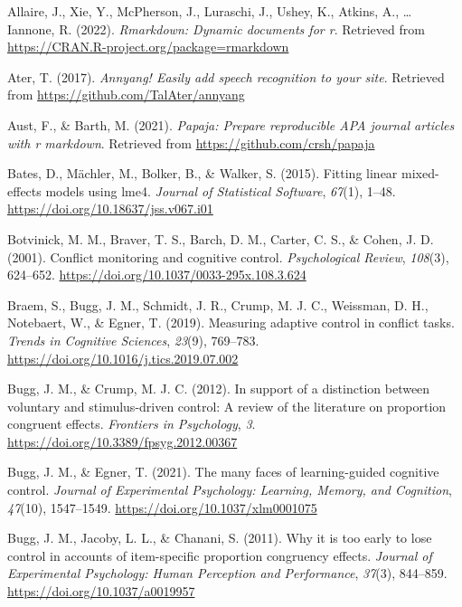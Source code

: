 \documentclass[
  ,man,floatsintext]{apa6}
\newlength{\cslhangindent}
\newlength{\cslentryspacingunit} %
\newenvironment{CSLReferences}[2] %
 {%
  \setlength{\parindent}{0pt}
  \ifodd #1
  \let\oldpar\par
  \def\par{\hangindent=\cslhangindent\oldpar}
  \fi
  \setlength{\parskip}{#2\cslentryspacingunit}
 }%
 {}
\begin{document}
\hypertarget{refs}{}
\begin{CSLReferences}{1}{0}
\leavevmode{}%
Allaire, J., Xie, Y., McPherson, J., Luraschi, J., Ushey, K., Atkins, A., \ldots{} Iannone, R. (2022). \emph{Rmarkdown: Dynamic documents for r}. Retrieved from \url{https://CRAN.R-project.org/package=rmarkdown}

\leavevmode{}%
Ater, T. (2017). \emph{Annyang! Easily add speech recognition to your site}. Retrieved from \url{https://github.com/TalAter/annyang}

\leavevmode{}%
Aust, F., \& Barth, M. (2021). \emph{Papaja: Prepare reproducible APA journal articles with r markdown}. Retrieved from \url{https://github.com/crsh/papaja}

\leavevmode{}%
Bates, D., Mächler, M., Bolker, B., \& Walker, S. (2015). Fitting linear mixed-effects models using {lme4}. \emph{Journal of Statistical Software}, \emph{67}(1), 1--48. \url{https://doi.org/10.18637/jss.v067.i01}

\leavevmode{}%
Botvinick, M. M., Braver, T. S., Barch, D. M., Carter, C. S., \& Cohen, J. D. (2001). Conflict monitoring and cognitive control. \emph{Psychological Review}, \emph{108}(3), 624--652. \url{https://doi.org/10.1037/0033-295x.108.3.624}

\leavevmode{}%
Braem, S., Bugg, J. M., Schmidt, J. R., Crump, M. J. C., Weissman, D. H., Notebaert, W., \& Egner, T. (2019). Measuring adaptive control in conflict tasks. \emph{Trends in Cognitive Sciences}, \emph{23}(9), 769--783. \url{https://doi.org/10.1016/j.tics.2019.07.002}

\leavevmode{}%
Bugg, J. M., \& Crump, M. J. C. (2012). In support of a distinction between voluntary and stimulus-driven control: A review of the literature on proportion congruent effects. \emph{Frontiers in Psychology}, \emph{3}. \url{https://doi.org/10.3389/fpsyg.2012.00367}

\leavevmode{}%
Bugg, J. M., \& Egner, T. (2021). The many faces of learning-guided cognitive control. \emph{Journal of Experimental Psychology: Learning, Memory, and Cognition}, \emph{47}(10), 1547--1549. \url{https://doi.org/10.1037/xlm0001075}

\leavevmode{}%
Bugg, J. M., Jacoby, L. L., \& Chanani, S. (2011). Why it is too early to lose control in accounts of item-specific proportion congruency effects. \emph{Journal of Experimental Psychology: Human Perception and Performance}, \emph{37}(3), 844--859. \url{https://doi.org/10.1037/a0019957}


\end{CSLReferences}
\end{document}
